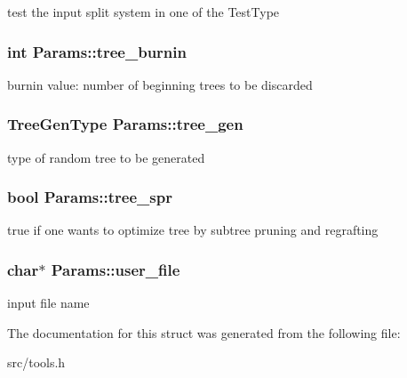 \label{structParams_aa079ee14272d9032681bb814d21fb6db}
test the input split system in one of the TestType \hypertarget{structParams_a74d04b254a9213c18dd3119331795ef5}{
\subsubsection[{tree\_\-burnin}]{\setlength{\rightskip}{0pt plus 5cm}int {\bf Params::tree\_\-burnin}}}
\label{structParams_a74d04b254a9213c18dd3119331795ef5}
burnin value: number of beginning trees to be discarded \hypertarget{structParams_af8d9052e0d195e5904e8322889534287}{
\subsubsection[{tree\_\-gen}]{\setlength{\rightskip}{0pt plus 5cm}TreeGenType {\bf Params::tree\_\-gen}}}
\label{structParams_af8d9052e0d195e5904e8322889534287}
type of random tree to be generated \hypertarget{structParams_a9123fc947c3d4707fa39debd109e70f1}{
\subsubsection[{tree\_\-spr}]{\setlength{\rightskip}{0pt plus 5cm}bool {\bf Params::tree\_\-spr}}}
\label{structParams_a9123fc947c3d4707fa39debd109e70f1}
true if one wants to optimize tree by subtree pruning and regrafting \hypertarget{structParams_ab48a8287f2f15edd57f036f11d63c943}{
\subsubsection[{user\_\-file}]{\setlength{\rightskip}{0pt plus 5cm}char$\ast$ {\bf Params::user\_\-file}}}
\label{structParams_ab48a8287f2f15edd57f036f11d63c943}
input file name 

The documentation for this struct was generated from the following file:\begin{DoxyCompactItemize}
\item 
src/tools.h\end{DoxyCompactItemize}
